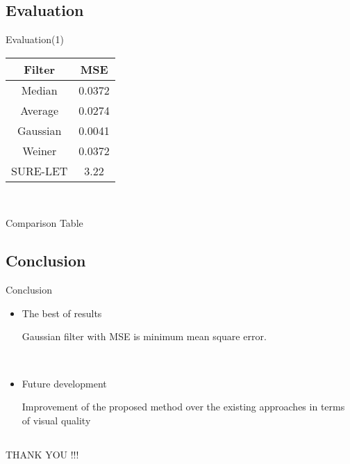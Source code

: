 \documentclass{beamer}
\begin{document}
\subsection{Evaluation}
\begin{frame}{Evaluation(1)}
\begin{center}
	
\begin{tabular}{|c|c|}

	\hline 
	Filter & MSE \\ 
	\hline 
	Median & 0.0372 \\ 
	\hline 
	Average & 0.0274 \\ 
	\hline 
	Gaussian & 0.0041 \\ 
	\hline 
	Weiner & 0.0372 \\ 
	\hline 
	SURE-LET & 3.22 \\ 
	\hline 
\end{tabular} 

\

Comparison Table
\end{center}
\end{frame}

\subsection{Conclusion}
\begin{frame}{Conclusion}
\begin{center}
\begin{itemize}
	\item The best of results
	
	 Gaussian filter with  MSE is minimum mean square error.

	
	\
    
    \item Future development
     
      Improvement of the proposed method over the existing approaches in terms of visual
     quality
\end{itemize}
\end{center}
 

\end{frame}



\subsection{}
\begin{frame}{}

\begin{center}
	\begin{LARGE}
		THANK YOU !!!
	\end{LARGE} 
\end{center}
\end{frame}
\end{document}
